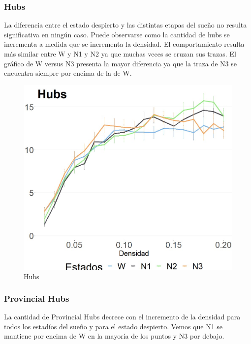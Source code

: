 \subsubsection{Hubs}
La diferencia entre el estado despierto y las distintas etapas del sueño no resulta significativa en ningún caso. Puede observarse como la cantidad de hubs se incrementa a medida que se incrementa la densidad. El comportamiento resulta más similar entre W y N1 y N2 ya que muchas veces se cruzan sus trazas. El gráfico de W versus N3 presenta la mayor diferencia ya que la traza de N3 se encuentra siempre por encima de la de W.

\begin{figure}[H]
    \centering
    \includegraphics[width = 5in]{img/5_hubs.jpg}
    \caption{Hubs}
    \label{fig:5_hubs}
\end{figure}

\subsubsection{Provincial Hubs}
La cantidad de Provincial Hubs decrece con el incremento de la densidad para todos los estadíos del sueño y
para el estado despierto. Vemos que N1 se mantiene por encima de W en la mayoría de los puntos y N3 por debajo.

